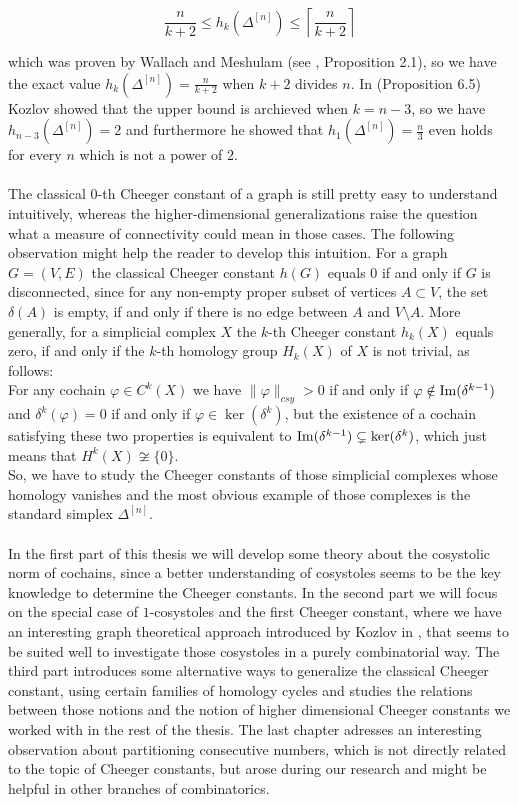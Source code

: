 \begin{equation}\label{equation1}
\frac{n}{k+2}\leq h_k(\Delta^{[n]})\leq\left\lceil\frac{n}{k+2}\right\rceil
\end{equation}

which was proven by Wallach and Meshulam (see \cite{4}, Proposition 2.1), so we have the exact value \(h_k(\Delta^{[n]})=\frac{n}{k+2}\) when \(k+2\) divides \(n\). In \cite{1} (Proposition 6.5) Kozlov showed that the upper bound is archieved when \(k=n-3\), so we have \(h_{n-3}(\Delta^{[n]})=2\) and furthermore he showed that \(h_1(\Delta^{[n]})=\frac{n}{3}\) even holds for every \(n\) which is not a power of \(2\).\\
\\
The classical \(0\)-th Cheeger constant of a graph is still pretty easy to understand intuitively, whereas the higher-dimensional generalizations raise the question what a measure of connectivity could mean in those cases. The following observation might help the reader to develop this intuition. For a graph \(G=(V,E)\) the classical Cheeger constant \(h(G)\) equals \(0\) if and only if \(G\) is disconnected, since for any non-empty proper subset of vertices \(A\subset V\), the set \(\delta(A)\) is empty, if and only if there is no edge between \(A\) and \(V\setminus A\). More generally, for a simplicial complex \(X\) the \(k\)-th Cheeger constant \(h_k(X)\) equals zero, if and only if the \(k\)-th homology group \(H_k(X)\) of \(X\) is not trivial, as follows:\\
For any cochain \(\varphi\in C^k(X)\) we have \(\|\varphi\|_{csy}>0\) if and only if \(\varphi\notin\mathrm{Im}(\delta^{k-1})\) and \(\delta^k(\varphi)=0\) if and only if \(\varphi\in\ker(\delta^k)\), but the existence of a cochain satisfying these two properties is equivalent to \(\mathrm{Im}(\delta^{k-1})\subsetneq\ker(\delta^k)\), which just means that \(H^k(X)\not\cong\{0\}\).\\
So, we have to study the Cheeger constants of those simplicial complexes whose homology vanishes and the most obvious example of those complexes is the standard simplex \(\Delta^{[n]}\).\\
\\
In the first part of this thesis we will develop some theory about the cosystolic norm of cochains, since a better understanding of cosystoles seems to be the key knowledge to determine the Cheeger constants. In the second part we will focus on the special case of \(1\)-cosystoles and the first Cheeger constant, where we have an interesting graph theoretical approach introduced by Kozlov in \cite{1}, that seems to be suited well to investigate those cosystoles in a purely combinatorial way. The third part introduces some alternative ways to generalize the classical Cheeger constant, using certain families of homology cycles and studies the relations between those notions and the notion of higher dimensional Cheeger constants we worked with in the rest of the thesis. The last chapter adresses an interesting observation about partitioning consecutive numbers, which is not directly related to the topic of Cheeger constants, but arose during our research and might be helpful in other branches of combinatorics.

